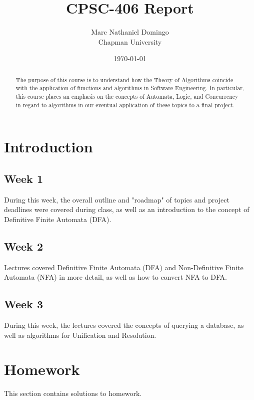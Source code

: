 \documentclass{article}
\title{CPSC-406 Report}
\author{Marc Nathaniel Domingo  \\ Chapman University}
\date{\today}
\theoremstyle{theorem}
\theoremstyle{definition}
\theoremstyle{remark}
\begin{document}
\maketitle

\begin{abstract}
The purpose of this course is to understand how the Theory of Algorithms coincide with the application of functions and algorithms in Software Engineering. In particular, this course places an emphasis on the concepts of Automata, Logic, and Concurrency in regard to algorithms in our eventual application of these topics to a final project. 
\end{abstract}

\tableofcontents

\section{Introduction}\label{intro}
\subsection{Week 1} During this week, the overall outline and "roadmap" of topics and project deadlines were covered during class, as well as an introduction to the concept of Definitive Finite Automata (DFA).
\subsection{Week 2} Lectures covered Definitive Finite Automata (DFA) and Non-Definitive Finite Automata (NFA) in more detail, as well as how to convert NFA to DFA.
\subsection{Week 3} During this week, the lectures covered the concepts of querying a database, as well as algorithms for Unification and Resolution.
\section{Homework}\label{homework}

This section contains solutions to homework. 
\end{document}
